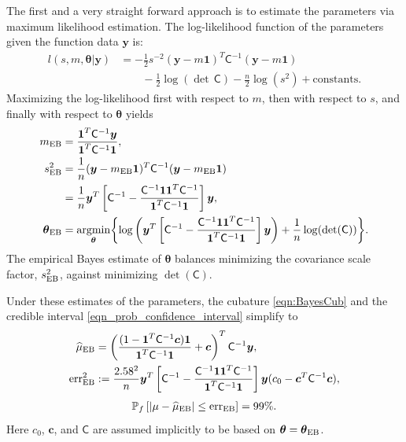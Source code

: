 \documentclass{iitthesis}          %
\newcommand{\bm}[1]{\boldsymbol{#1}}
\newcommand{\vtheta}{{\bm{\theta}}}
\newcommand{\vc}{\bm{c}}
\newcommand{\vy}{\bm{y}}
\newcommand{\vone}{\bm{1}}
\newcommand{\mC}{\mathsf{C}}
\newcommand{\mCInv}{{\mathsf{C}^{-1}}}
\newcommand{\hmu}{\widehat{\mu}}
\newcommand{\MLE}{\textup{EB}}
\newcommand{\err}{\textup{err}}
\providecommand{\argmin}{\operatorname*{argmin}}
\begin{document}
  \label{sec:MLE}

The first and a very straight forward approach is to estimate the parameters via maximum likelihood estimation.  The log-likelihood function of the parameters given the function data $\vy$ is:
\begin{align*}
l(s,m,\vtheta | \vy)
&= -\frac{1}{2} s^{-2} (\vy-m\vone)^T\mCInv(\vy-m\vone) 
\\ & \qquad
 - \frac{1}{2} \log(\det\, \mC) - \frac{n}{2} \log(s^2) + \text{constants.}
\end{align*}
Maximizing the log-likelihood first with respect to $m$, then with respect to $s$, and finally with respect to $\vtheta$ yields
\begin{align*}
m_\MLE &= \frac{\vone^T \mCInv \vy }{ \vone^T \mCInv \vone}, \\
\nonumber
s^2_{\MLE}  
&= \frac{1}{n} (\vy-m_{\MLE}\vone)^T\mCInv(\vy-m_{\MLE}\vone) 
\\
&= 
\frac{1}{n}
\vy^T 
\left[ 
\mCInv - 
\frac{ \mCInv \vone \vone^T \mCInv }{\vone^T\mCInv \vone}
\right] \vy, \\
\vtheta_\MLE
&= \argmin_{\vtheta} \biggl \{
\log\left(\vy^T 
\left[ \mCInv - 
\frac{ \mCInv \vone \vone^T \mCInv }{\vone^T\mCInv \vone}
\right] \vy 
\right)  +  \frac{1}{n} \log(\det(\mC))
\biggr \}.
\end{align*}
The empirical Bayes estimate of $\vtheta$ balances minimizing the covariance scale factor, $s^2_{\MLE}$, against minimizing  $\det(\mC)$. 

Under these estimates of the parameters, the cubature \eqref{eqn:BayesCub} and the credible interval \eqref{eqn_prob_confidence_interval} simplify to 
\begin{align*} %
\hmu_\MLE  &= 
\left(
\frac{ (1 - \vone^T  \mCInv\vc )  \vone }{ \vone^T \mCInv \vone}   +  \vc 
\right)^T  \mCInv \vy, \\
\err_\MLE^2 & : = \frac{2.58^2}{n}
 \vy^T \left[ \mCInv - 
\frac{ \mCInv \vone \vone^T \mCInv }{\vone^T\mCInv \vone}
\right] \vy  
(c_0 - \vc^T\mC^{-1}\vc ),
\end{align*}
\begin{align}
\label{eqn_prob_CI_MLE}
\mathbb{P}_f \left[
|\mu-\hmu_\MLE| \leq \err_\MLE \right]  = 99\%.
\end{align}
Here $c_0$, $\vc$, and $\mC$ are assumed implicitly to be based on $\vtheta = \vtheta_\MLE$.   
\end{document}
